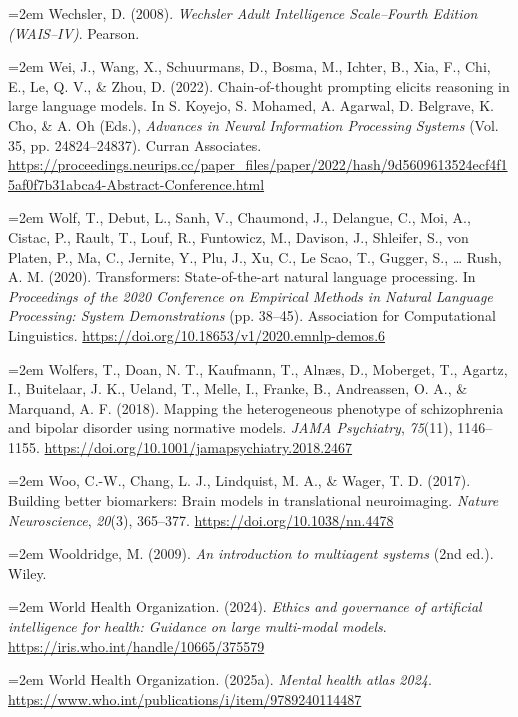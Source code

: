 \documentclass[11pt,a4paper,twoside]{article}
\begin{document}
\hangindent=2em Wechsler, D. (2008). \textit{Wechsler Adult Intelligence Scale--Fourth Edition (WAIS--IV)}. Pearson.

\hangindent=2em Wei, J., Wang, X., Schuurmans, D., Bosma, M., Ichter, B., Xia, F., Chi, E., Le, Q. V., \& Zhou, D. (2022). Chain-of-thought prompting elicits reasoning in large language models. In S. Koyejo, S. Mohamed, A. Agarwal, D. Belgrave, K. Cho, \& A. Oh (Eds.), \textit{Advances in Neural Information Processing Systems} (Vol. 35, pp. 24824--24837). Curran Associates. \url{https://proceedings.neurips.cc/paper_files/paper/2022/hash/9d5609613524ecf4f15af0f7b31abca4-Abstract-Conference.html}

\hangindent=2em Wolf, T., Debut, L., Sanh, V., Chaumond, J., Delangue, C., Moi, A., Cistac, P., Rault, T., Louf, R., Funtowicz, M., Davison, J., Shleifer, S., von Platen, P., Ma, C., Jernite, Y., Plu, J., Xu, C., Le Scao, T., Gugger, S., \ldots{} Rush, A. M. (2020). Transformers: State-of-the-art natural language processing. In \textit{Proceedings of the 2020 Conference on Empirical Methods in Natural Language Processing: System Demonstrations} (pp. 38--45). Association for Computational Linguistics. \url{https://doi.org/10.18653/v1/2020.emnlp-demos.6}

\hangindent=2em Wolfers, T., Doan, N. T., Kaufmann, T., Alnæs, D., Moberget, T., Agartz, I., Buitelaar, J. K., Ueland, T., Melle, I., Franke, B., Andreassen, O. A., \& Marquand, A. F. (2018). Mapping the heterogeneous phenotype of schizophrenia and bipolar disorder using normative models. \textit{JAMA Psychiatry}, \textit{75}(11), 1146--1155. \url{https://doi.org/10.1001/jamapsychiatry.2018.2467}

\hangindent=2em Woo, C.-W., Chang, L. J., Lindquist, M. A., \& Wager, T. D. (2017). Building better biomarkers: Brain models in translational neuroimaging. \textit{Nature Neuroscience}, \textit{20}(3), 365--377. \url{https://doi.org/10.1038/nn.4478}

\hangindent=2em Wooldridge, M. (2009). \textit{An introduction to multiagent systems} (2nd ed.). Wiley.

\hangindent=2em World Health Organization. (2024). \textit{Ethics and governance of artificial intelligence for health: Guidance on large multi-modal models}. \url{https://iris.who.int/handle/10665/375579}

\hangindent=2em World Health Organization. (2025a). \textit{Mental health atlas 2024}. \url{https://www.who.int/publications/i/item/9789240114487}
\end{document}
